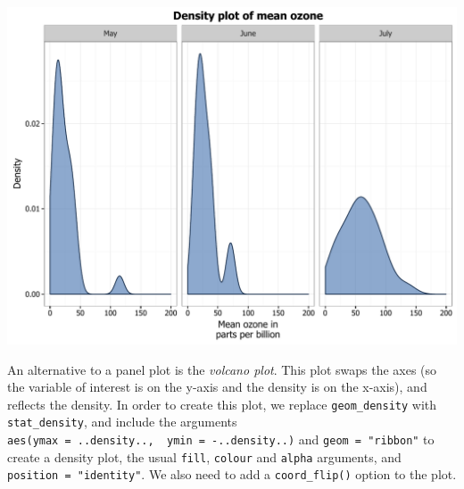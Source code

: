 \documentclass[]{article}
\begin{document}
\begin{center}\includegraphics{0_all_posts_pdf/density_14-1} \end{center}

An alternative to a panel plot is the \emph{volcano plot}. This plot
swaps the axes (so the variable of interest is on the y-axis and the
density is on the x-axis), and reflects the density. In order to create
this plot, we replace \texttt{geom\_density} with
\texttt{stat\_density}, and include the arguments
\texttt{aes(ymax\ =\ ..density..,\ \ ymin\ =\ -..density..)} and
\texttt{geom\ =\ "ribbon"} to create a density plot, the usual
\texttt{fill}, \texttt{colour} and \texttt{alpha} arguments, and
\texttt{position\ =\ "identity"}. We also need to add a
\texttt{coord\_flip()} option to the plot.
\end{document}
